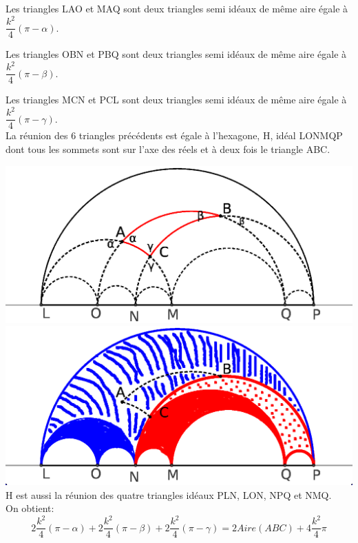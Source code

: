 \documentclass[a4paper, 12pt, twoside]{book}
\begin{document}
   Les triangles LAO et MAQ sont deux triangles semi idéaux de même aire égale à $\dfrac{k^{2}}{4}(\pi-\alpha)$.\
   
    Les triangles OBN et PBQ sont deux triangles semi idéaux de même aire égale à $\dfrac{k^{2}}{4}(\pi-\beta)$.\
    
     Les triangles MCN et PCL sont deux triangles semi idéaux de même aire égale à $\dfrac{k^{2}}{4}(\pi-\gamma)$.\\
     
     La réunion des 6 triangles précédents est égale à l'hexagone, H, idéal LONMQP dont tous les sommets sont sur l'axe des réels et à deux fois le triangle ABC.\
     
    
    
   \includegraphics[scale=0.7]{figures/hyper22.eps}\\
   
    
  
  
   
   \includegraphics[scale=0.7]{figures/hyper27.eps}\\ 
  
  H est aussi la réunion des quatre triangles idéaux PLN, LON, NPQ et NMQ.\\
  
  On obtient: $$2\dfrac{k^{2}}{4}(\pi-\alpha)+2\dfrac{k^{2}}{4}(\pi-\beta)+2\dfrac{k^{2}}{4}(\pi-\gamma)=2Aire(ABC)+4\dfrac{k^{2}}{4}\pi$$    
  
\end{document}
